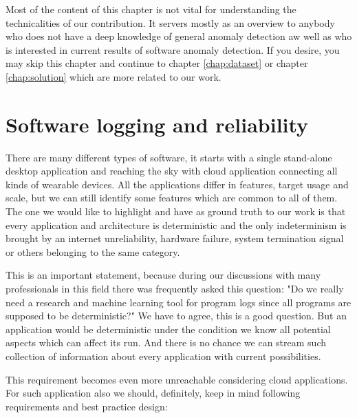 Most of the content of this chapter is not vital for understanding the technicalities of our contribution. It servers mostly as an overview to anybody who does not have a deep knowledge of general anomaly detection aw well as who is interested in current results of software anomaly detection. If you desire, you may skip this chapter and continue to chapter \ref{chap:dataset} or chapter \ref{chap:solution} which are more related to our work.


\section{Software logging and reliability}

There are many different types of software, it starts with a single stand-alone desktop application and reaching the sky with cloud application connecting all kinds of wearable devices. All the applications differ in features, target usage and scale, but we can still identify some features which are common to all of them. The one we would like to highlight and have as ground truth to our work is that every application and architecture is deterministic and the only indeterminism is brought by an internet unreliability, hardware failure, system termination signal or others belonging to the same category.

This is an important statement, because during our discussions with many professionals in this field there was frequently asked this question: "Do we really need a research and machine learning tool for program logs since all programs are supposed to be deterministic?" We have to agree, this is a good question. But an application would be deterministic under the condition we know all potential aspects which can affect its run. And there is no chance we can stream such collection of information about every application with current possibilities.

This requirement becomes even more unreachable considering cloud applications. For such application also we should, definitely, keep in mind following requirements and best practice design:

